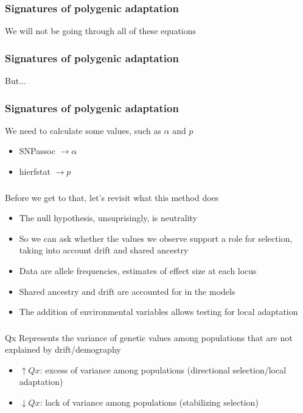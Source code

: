 \begin{frame}
\frametitle{Signatures of polygenic adaptation}
\begin{block}{}
\centering
We will not be going through all of these equations
\end{block}
\tiny
\citet[Figure 1]{Berg:2014bs}
\end{frame}

\begin{frame}
\frametitle{Signatures of polygenic adaptation}
\begin{block}{}
\centering
But...
\end{block}
\tiny
\citet[Figure 1]{Berg:2014bs}
\end{frame}

\begin{frame}
\frametitle{Signatures of polygenic adaptation}
\begin{block}{We need to calculate some values, such as $\alpha$ and $p$}
\centering
\begin{itemize}
\item{SNPassoc $\longrightarrow \alpha$}
\item{hierfstat $\longrightarrow p$}
\end{itemize}
\end{block}
\end{frame}

\begin{frame}
\frametitle{}
\begin{block}{Before we get to that, let's revisit what this method does}
\begin{itemize}
\item{The null hypothesis, unsuprisingly, is neutrality}
\item{So we can ask whether the values we observe support a role for selection,
taking into account drift and shared ancestry}
\item{Data are allele frequencies, estimates of effect size at each locus}
\item{Shared ancestry and drift are accounted for in the models}
\item{The addition of environmental variables allows testing for local
adaptation}
\end{itemize}
\end{block}
\end{frame}

\begin{frame}
\frametitle{}
\begin{block}{Qx}
Represents the variance of genetic values among populations that are not
explained by drift/demography
\begin{itemize}
\item{$\uparrow Qx$: excess of variance among populations (directional
selection/local adaptation)}
\item{$\downarrow Qx$: lack of variance among populations (stabilizing
selection)}
\end{itemize}

\end{block}
\end{frame}



